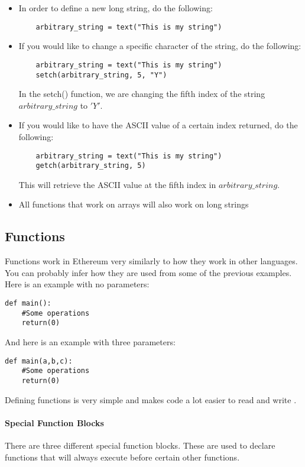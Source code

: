 \documentclass[12pt]{article}
\begin{document}
\begin{itemize}
\item In order to define a new long string, do the following:
	\begin{lstlisting}
	arbitrary_string = text("This is my string")
	\end{lstlisting}
\item If you would like to change a specific character of the string, do the following:
	\begin{lstlisting}
	arbitrary_string = text("This is my string")
	setch(arbitrary_string, 5, "Y")
	\end{lstlisting}
	In the setch() function, we are changing the fifth index of the string $arbitrary\_string$ to $'Y'$.
\item If you would like to have the ASCII value of a certain index returned, do the following:
	\begin{lstlisting}
	arbitrary_string = text("This is my string")
	getch(arbitrary_string, 5)
	\end{lstlisting}
	This will retrieve the ASCII value at the fifth index in $arbitrary\_string$.
\item All functions that work on arrays will also work on long strings
\end{itemize} \cite{Serpent,Serpent 1.0 (old)}
	
\subsection{Functions}
Functions work in Ethereum very similarly to how they work in other languages. You can probably infer how they are used from some of the previous examples. Here is an example with no parameters:

\begin{lstlisting}
def main():
	#Some operations
	return(0)
\end{lstlisting}

And here is an example with three parameters:

\begin{lstlisting}
def main(a,b,c):
	#Some operations
	return(0)
\end{lstlisting}

Defining functions is very simple and makes code a lot easier to read and write \cite{Serpent}. 

\paragraph{Special Function Blocks}
There are three different special function blocks. These are used to declare functions that will always execute before certain other functions.
\end{document}

